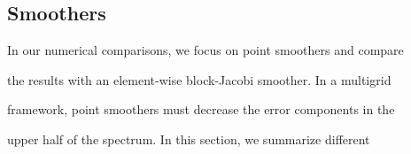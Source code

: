 \documentclass[smallcondensed,final]{svjour3}     %
\begin{document}





























\subsection{Smoothers}\label{subsec:smoothers}

In our numerical comparisons, we focus on point smoothers and compare

the results with an element-wise block-Jacobi smoother. In a multigrid

framework, point smoothers must decrease the error components in the

upper half of the spectrum.  In this section, we summarize different
\end{document}
